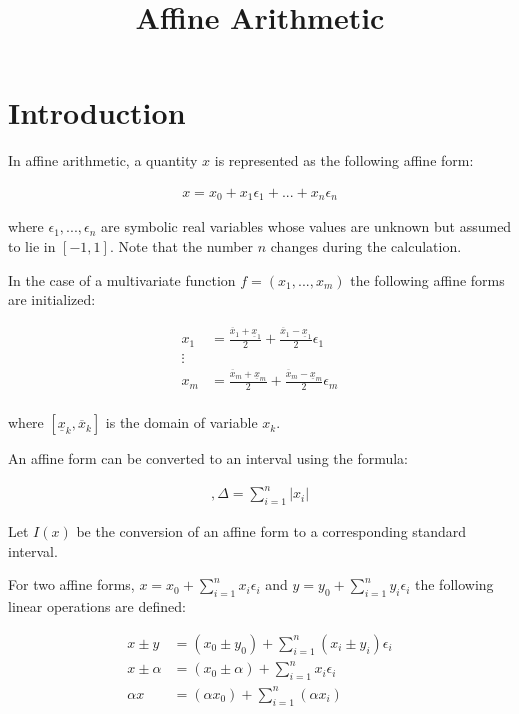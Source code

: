 \documentclass[12pt]{scrartcl} %
\title{Affine Arithmetic}
\begin{document}
\maketitle

\section{Introduction}

In affine arithmetic, a quantity $x$ is represented as the following affine form:

\begin{align}
    x = x_0 + x_1 \epsilon_1 + ... + x_n \epsilon_n
\end{align}

where $\epsilon_1, ..., \epsilon_n$ are symbolic real variables whose values are unknown but assumed to lie in $[-1, 1]$. Note that the number $n$ changes during the calculation.

In the case of a multivariate function $f=(x_1,...,x_m)$ the following affine forms are initialized:

\begin{align}
    x_1 &= \frac{\overline{x}_1 + \underline{x}_1}{2} +  \frac{\overline{x}_1 - \underline{x}_1}{2} \epsilon_1\\
    \vdots\\
    x_m &= \frac{\overline{x}_m + \underline{x}_m}{2} +  \frac{\overline{x}_m - \underline{x}_m}{2} \epsilon_m\\
\end{align}

where $[\underline{x}_k, \overline{x}_k]$ is the domain of variable $x_k$.

An affine form can be converted to an interval using the formula:

\begin{align}
    [x_0 - \Delta, x_0 + \Delta], \Delta = \sum_{i=1}^n |x_i|
\end{align}

Let $I(x)$ be the conversion of an affine form to a corresponding standard interval.

For two affine forms, $x = x_0 + \sum_{i=1}^n x_i \epsilon_i$ and $y = y_0 + \sum_{i=1}^n y_i \epsilon_i$ the following linear operations are defined:

\begin{align}
    x \pm y &= (x_0 \pm y_0) + \sum_{i=1}^n (x_i \pm y_i) \epsilon_i\\
    x \pm \alpha &= (x_0 \pm \alpha) + \sum_{i=1}^n x_i \epsilon_i\\
    \alpha x &= (\alpha x_0) + \sum_{i=1}^n (\alpha x_i)
\end{align}
\end{document}
